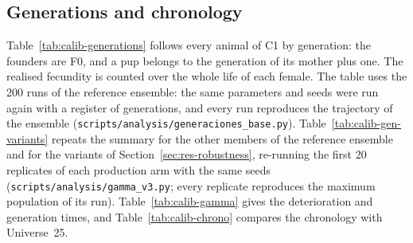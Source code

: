 \begin{table}[t]
  \centering
  \caption{Founder protocol (four pairs of 7-week-old animals in one cell). Fractions of PASS runs, with
  95\% Wilson intervals where $n\ge30$; counts for the exploratory row with $n=8$. ``No latency'' founders
  start with $s=1$; ``adaptation'' founders start with $s=0.3$. Same-cell rows use $s=1$.}
  \label{tab:calib-founders}
  \small
\end{table}

\subsection{Generations and chronology}
\label{app:calib-generations}

Table~\ref{tab:calib-generations} follows every animal of \textsf{C1} by generation: the founders are F0, and a pup
belongs to the generation of its mother plus one. The realised fecundity is counted over the whole life of each
female. The table uses the 200 runs of the reference ensemble: the same parameters and seeds were run
again with a register of generations, and every run reproduces the trajectory of the ensemble
(\texttt{scripts/analysis/generaciones\_base.py}). Table~\ref{tab:calib-gen-variants} repeats the summary for the
other members of the reference ensemble and for the variants of Section~\ref{sec:res-robustness}, re-running the first
20 replicates of each production arm with the same seeds (\texttt{scripts/analysis/gamma\_v3.py}; every replicate
reproduces the maximum population of its run). Table~\ref{tab:calib-gamma} gives the deterioration and generation
times, and Table~\ref{tab:calib-chrono} compares the chronology with Universe~25.

